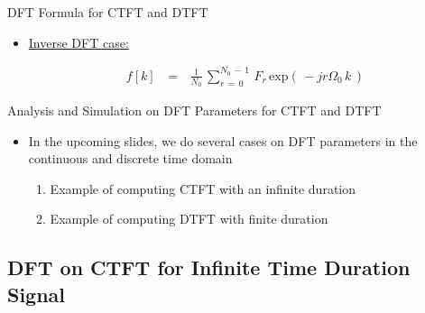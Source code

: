 \begin{frame}[t,allowframebreaks]{DFT Formula for CTFT and DTFT}
\begin{minipage}{\textwidth}
\begin{itemize}
where $\begin{cases}
r \, = \, 0,1,2, \rightarrow \, N_0 \, - \, 1 \\
\Omega_0 \, = \,  \displaystyle\frac{2 \, \pi}{N_0} \, = \, \text{freqeuncy step at which}\\
\text{we sample the DTFT spectrum}
\end{cases}$\\

\item  \underline{Inverse DFT case:}

\begin{equation}
\begin{array}{rcl}
f[k] \, &=&\, \displaystyle\frac{1}{N_0} \, \displaystyle\sum_{r \, = \, 0}^{N_0 \, - \, 1} \, F_r \, \text{exp} \left(\, -j r \Omega_0 \, k   \,\right)
\end{array}
\end{equation}

\end{itemize}

\end{minipage}


\end{frame}




\begin{frame}[t]{Analysis and Simulation on DFT Parameters for CTFT and DTFT}

\begin{itemize}

\item In the upcoming slides, we do several cases on DFT parameters in the continuous and discrete time domain

	\begin{enumerate}
	\item Example of computing CTFT with an infinite duration
	
	\item Example of computing DTFT with finite duration
	
	\end{enumerate}


\end{itemize}


\end{frame}

\subsection{DFT on CTFT for Infinite Time Duration Signal}



